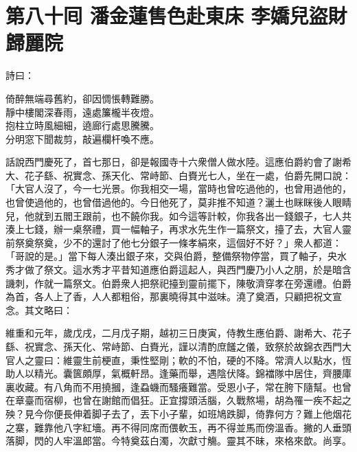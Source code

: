 
\chapter*{第八十囘 潘金蓮售色赴東床 李嬌兒盜財歸麗院}


詩曰：

\begin{myquote} 
倚醉無端尋舊約，卻因惆悵轉難勝。\\靜中樓閣深春雨，遠處簾櫳半夜燈。\\抱柱立時風細細，遶廊行處思騰騰。\\分明窓下聞裁剪，敲遍欄杆喚不應。
\end{myquote} 

話說西門慶死了，首七那日，卻是報國寺十六衆僧人做水陸。這應伯爵約會了謝希大、花子繇、祝實念、孫天化、常峙節、白賚光七人，坐在一處，伯爵先開口說：「大官人沒了，今一七光景。你我相交一場，當時也曾吃過他的，也曾用過他的，也曾使過他的，也曾借過他的。今日他死了，莫非推不知道？{}灑土也眯眯後人眼睛兒，他就到五閻王跟前，也不饒你我。{}如今這等計較，你我各出一錢銀子，七人共湊上七錢，辦一桌祭禮，買一幅軸子，再求水先生作一篇祭文，擡了去，大官人靈前祭奠祭奠，少不的還討了他七分銀子一條孝絹來，這個好不好？」衆人都道：「哥說的是。」當下每人湊出銀子來，交與伯爵，整備祭物停當，買了軸子，央水秀才做了祭文。這水秀才平昔知道應伯爵這起人，與西門慶乃小人之朋，於是暗含譏刺，作就一篇祭文。伯爵衆人把祭祀擡到靈前擺下，陳敬濟穿孝在旁還禮。伯爵為首，各人上了香，人人都粗俗，那裏曉得其中滋味。澆了奠酒，只顧把祝文宣念。其文略曰：

\begin{myquote}[\markfont]
維重和元年，歲戊戌，二月戊子期，越初三日庚寅，侍教生應伯爵、謝希大、花子繇、祝實念、孫天化、常峙節、白賚光，謹以清酌庶饈之儀，致祭於故錦衣西門大官人之靈曰：維靈生前梗直，秉性堅剛；軟的不怕，硬的不降。常濟人以點水，恆助人以精光。囊篋頗厚，氣概軒昂。逢藥而舉，遇陰伏降。錦襠隊中居住，齊腰庫裏收藏。有八角而不用撓摑，逢蝨蟣而騷癢難當。受恩小子，常在胯下隨幫。也曾在章臺而宿柳，也曾在謝館而倡狂。正宜撐頭活腦，久戰熬場，胡為罹一疾不起之殃？見今你便長伸着脚子去了，丟下小子輩，如班鳩跌脚，倚靠何方？難上他烟花之寨，難靠他八字紅墻。再不得同席而偎軟玉，再不得並馬而傍溫香。撇的人垂頭落脚，閃的人牢溫郎當。今特奠茲白濁，次獻寸觴。靈其不昧，來格來歆。尚享。{}
\end{myquote} 

